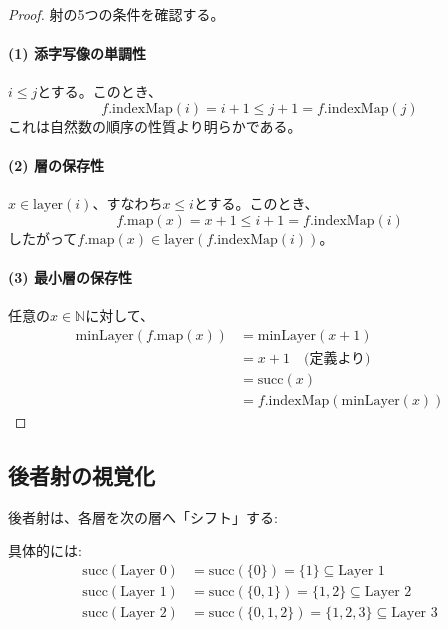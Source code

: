 \documentclass[a4paper,12pt]{article}
\theoremstyle{definition}
\begin{document}
\begin{proof}
射の5つの条件を確認する。

\paragraph{(1) 添字写像の単調性}
$i \leq j$とする。このとき、
\[
f.\text{indexMap}(i) = i + 1 \leq j + 1 = f.\text{indexMap}(j)
\]
これは自然数の順序の性質より明らかである。

\paragraph{(2) 層の保存性}
$x \in \text{layer}(i)$、すなわち$x \leq i$とする。このとき、
\[
f.\text{map}(x) = x + 1 \leq i + 1 = f.\text{indexMap}(i)
\]
したがって$f.\text{map}(x) \in \text{layer}(f.\text{indexMap}(i))$。

\paragraph{(3) 最小層の保存性}
任意の$x \in \mathbb{N}$に対して、
\begin{align*}
\text{minLayer}(f.\text{map}(x)) &= \text{minLayer}(x + 1) \\
&= x + 1 \quad \text{(定義より)} \\
&= \text{succ}(x) \\
&= f.\text{indexMap}(\text{minLayer}(x))
\end{align*}
\end{proof}

\subsection{後者射の視覚化}

後者射は、各層を次の層へ「シフト」する:

\begin{center}
\end{center}

具体的には:
\begin{align*}
\text{succ}(\text{Layer } 0) &= \text{succ}(\{0\}) = \{1\} \subseteq \text{Layer } 1 \\
\text{succ}(\text{Layer } 1) &= \text{succ}(\{0, 1\}) = \{1, 2\} \subseteq \text{Layer } 2 \\
\text{succ}(\text{Layer } 2) &= \text{succ}(\{0, 1, 2\}) = \{1, 2, 3\} \subseteq \text{Layer } 3
\end{align*}
\end{document}
